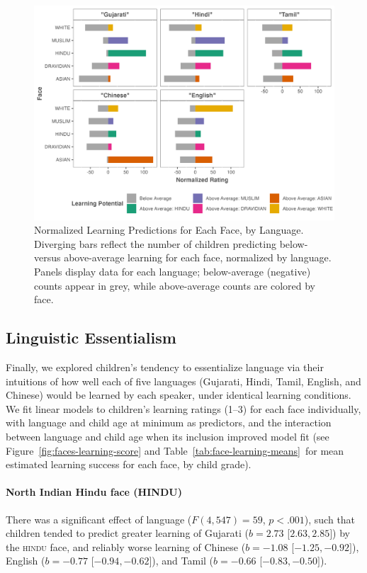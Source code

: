 \documentclass{foushee-adapted-preprint}
\newcommand{\learningmeanstab}{\ref{tab:face-learning-means}}
\begin{document}
\begin{figure}[h]
    \centering
    \includegraphics[width=\linewidth]{figures/std_plots/learning_diverging_barplot_colored.png}
    \caption{Normalized Learning Predictions for Each Face, by Language. Diverging bars reflect the number of children predicting below- versus above-average learning for each face, normalized by language. Panels display data for each language; below-average (negative) counts appear in grey, while above-average counts are colored by face.
    \label{fig:faces-learning-diverging}}
\vspace{-7pt}
\end{figure}
\subsection*{Linguistic Essentialism} 
Finally, we explored children's tendency to essentialize language via their intuitions of how well each of five languages (Gujarati, Hindi, Tamil, English, and Chinese) would be learned by each speaker, under identical learning conditions. 
We fit linear models to children's learning ratings (1--3) for each face individually, with language and child age at minimum as predictors, and the interaction between language and child age when its inclusion improved model fit (see Figure~\ref{fig:faces-learning-score} and Table~\learningmeanstab\ for mean estimated learning success for each face, by child grade).
\paragraph*{North Indian Hindu face {\small{(HINDU)}}} 
There was a significant effect of language ($F(4, 547)=59$, $p<.001$), such that children tended to predict greater learning of Gujarati ($b=2.73$ [$2.63, 2.85]$) by the \textsc{hindu} face, and reliably worse learning of Chinese ($b=-1.08$ [$-1.25, -0.92]$), English ($b=-0.77$ [$-0.94, -0.62]$), and Tamil ($b=-0.66$ [$-0.83, -0.50]$).
\end{document}
